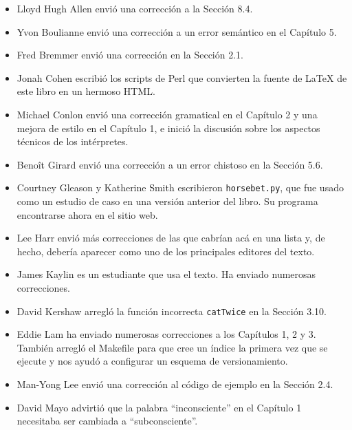 \documentclass[10pt]{book}
\begin{document}
\begin{itemize}

\small
\item Lloyd Hugh Allen envió una corrección a la Sección 8.4.

\item Yvon Boulianne envió una corrección a un error semántico en
el Capítulo 5.

\item Fred Bremmer envió una corrección en la Sección 2.1.

\item Jonah Cohen escribió los scripts de Perl que convierten la
fuente de LaTeX de este libro en un hermoso HTML.

\item Michael Conlon envió una corrección gramatical en el Capítulo 2
y una mejora de estilo en el Capítulo 1, e inició la discusión
sobre los aspectos técnicos de los intérpretes.

\item Beno\^{i}t Girard envió una
corrección a un error chistoso en la Sección 5.6.

\item Courtney Gleason y Katherine Smith escribieron {\tt horsebet.py}, que
fue usado como un estudio de caso en una versión anterior del libro.  Su
programa encontrarse ahora en el sitio web.

\item Lee Harr envió más correcciones de las que cabrían acá en una lista
y, de hecho, debería aparecer como uno de los principales editores
del texto.

\item James Kaylin es un estudiante que usa el texto. Ha enviado
numerosas correcciones.

\item David Kershaw arregló la función incorrecta {\tt catTwice} en la Sección
3.10.

\item Eddie Lam ha enviado numerosas correcciones a los Capítulos
1, 2 y 3.
También arregló el Makefile para que cree un índice la primera vez que
se ejecute y nos ayudó a configurar un esquema de versionamiento.

\item Man-Yong Lee envió una corrección al código de ejemplo en la
Sección 2.4.

\item David Mayo advirtió que la palabra ``inconsciente''
en el Capítulo 1 necesitaba
ser cambiada a ``subconsciente''.


\end{itemize}
\end{document}
